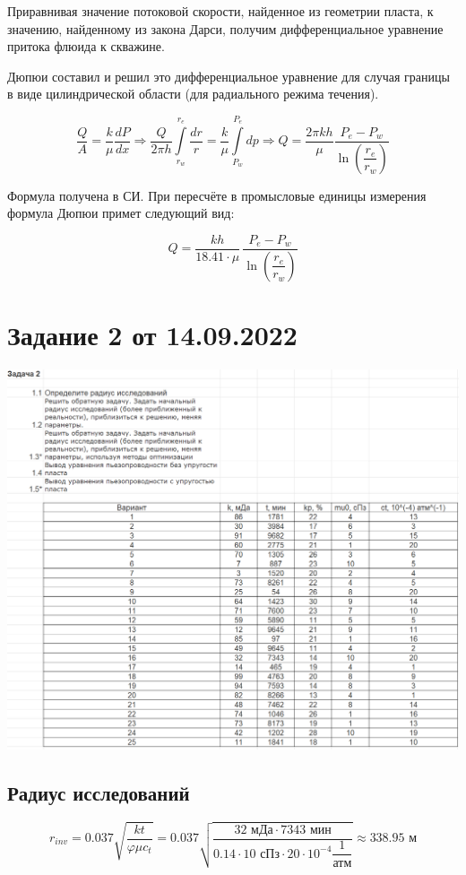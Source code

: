 \documentclass[a4paper,12pt]{article}
\newcommand{\beq}{\begin{equation}}
\newcommand{\eeq}{\end{equation}}
\begin{document}
Приравнивая значение потоковой скорости, найденное из геометрии пласта, к значению, найденному из закона Дарси, получим дифференциальное уравнение притока флюида к скважине.

Дюпюи составил и решил это дифференциальное уравнение для случая границы в виде цилиндрической области (для радиального режима течения).

\beq
\frac{Q}{A}=\frac{k}{\mu}\frac{dP}{dx}\Rightarrow\frac{Q}{2\pi h}\int\limits_{r_w}^{r_e}{\frac{dr}{r}}=\frac{k}{\mu}\int\limits_{P_w}^{P_e}{dp}\Rightarrow Q=\frac{2\pi kh}{\mu}\frac{P_e-P_w}{\ln{\left(\dfrac{r_e}{r_w}\right)}}
\eeq

Формула получена в СИ.
При пересчёте в промысловые единицы измерения формула Дюпюи примет следующий вид:

\beq
Q=\frac{kh}{18.41\cdot\mu}\,\frac{P_e-P_w}{\ln{\left(\dfrac{r_e}{r_w}\right)}}
\eeq

\section{Задание 2 от 14.09.2022}
\includegraphics[width=\textwidth]{task2}

\subsection{Радиус исследований}

\beq
r_{inv}=0.037\sqrt{\frac{kt}{\varphi \mu c_t}}=0.037\sqrt{\frac{32\text{ мДа}\cdot 7343\text{ мин}}{0.14\cdot 10\text{ сПз}\cdot 20\cdot 10^{-4}\dfrac{\text{1}}{\text{атм}}}}\approx 338.95\text{ м}
\eeq
\end{document}
